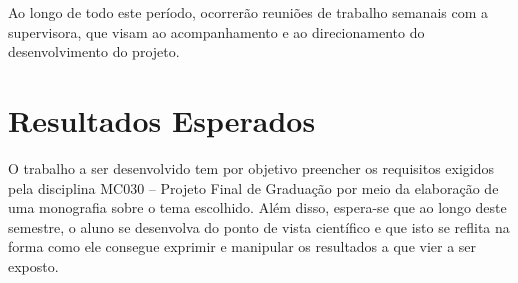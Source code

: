 Ao longo de todo este período, ocorrerão reuniões de trabalho semanais com a supervisora, que visam ao acompanhamento e ao direcionamento do desenvolvimento do projeto.


\section*{Resultados Esperados}

O trabalho a ser desenvolvido tem por objetivo preencher os requisitos
exigidos pela disciplina MC030 -- Projeto Final de Graduação por meio
da elaboração de uma monografia sobre o tema escolhido. Além disso,
espera-se que ao longo deste semestre, o aluno se desenvolva do ponto
de vista científico e que isto se reflita na forma como ele consegue
exprimir e manipular os resultados a que vier a ser exposto.

